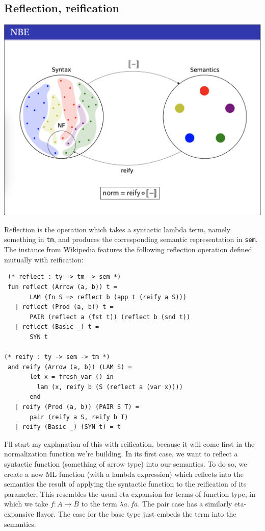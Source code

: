 \documentclass[11pt]{article}
\begin{document}
\subsection{Reflection, reification}
\label{sec:org4f70c8b}
\begin{center}
\includegraphics[width=.9\linewidth]{nbe.png}
\end{center}
Reflection is the operation which takes a syntactic lambda term, namely
something in \texttt{tm}, and produces the corresponding semantic representation in
\texttt{sem}. The instance from Wikipedia features the following reflection operation
defined mutually with reification:
\begin{verbatim}
 (* reflect : ty -> tm -> sem *)
 fun reflect (Arrow (a, b)) t =
       LAM (fn S => reflect b (app t (reify a S)))
   | reflect (Prod (a, b)) t =
       PAIR (reflect a (fst t)) (reflect b (snd t))
   | reflect (Basic _) t =
       SYN t

(* reify : ty -> sem -> tm *)
 and reify (Arrow (a, b)) (LAM S) =
       let x = fresh_var () in
         lam (x, reify b (S (reflect a (var x))))
       end
   | reify (Prod (a, b)) (PAIR S T) =
       pair (reify a S, reify b T)
   | reify (Basic _) (SYN t) = t
\end{verbatim}

I'll start my explanation of this with reification, because it will come first
in the normalization function we're building. In its first case, we want to
reflect a syntactic function (something of arrow type) into our semantics. To do
so, we create a new ML function (with a lambda expression) which reflects into
the semantics the result of applying the syntactic function to the reification
of its parameter. This resembles the usual eta-expansion for terms of function
type, in which we take \(f: A \rightarrow B\) to the term \(\lambda a.\, f a\). The pair case has a similarly eta-expansive flavor. The case for the base
type just embeds the term into the semantics.
\end{document}
